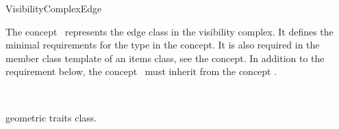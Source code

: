 
\ccRefPageBegin


\begin{ccRefConcept}{VisibilityComplexEdge}
\label{pageVCEdgeRef}
  
\ccDefinition

The concept \ccRefName\ represents the edge class in the visibility complex.
It defines the minimal requirements for the  type in the
 concept. It is also required in the
 member class template of an items class, see the
 concept. In addition to the requirement below, the
concept \ccRefName\ must inherit from the  concept
.
  
\ccInheritsFrom
{}\\

\ccTypes
{}
\ccThreeToTwo

 {geometric traits class. }
\ccGlue
{}
\ccGlue
{}
\ccGlue
{}

\ccGlue
{}
\ccGlue
{}

\ccThreeToTwo


\end{ccRefConcept}
